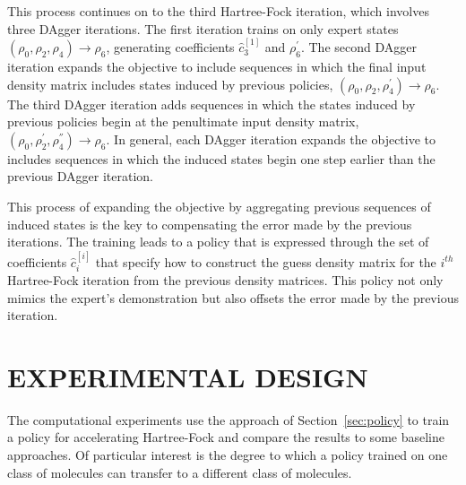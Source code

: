 \documentclass[twoside,11pt]{article}
\begin{document}
This process continues on to the third Hartree-Fock iteration, which involves three DAgger iterations. The first iteration trains on only expert states $(\rho_0, \rho_2, \rho_4) \rightarrow \rho_6$, generating coefficients $\hat{c}^{[1]}_3$ and $\rho_6^{'}$. The second DAgger iteration expands the objective to include sequences in which the final input density matrix includes states induced by previous policies, $(\rho_0, \rho_2, \rho_4^{'}) \rightarrow \rho_6$. The third DAgger iteration adds sequences in which the states induced by previous policies begin at the penultimate input density matrix,  $(\rho_0, \rho_2^{'}, \rho_{4}^{''}) \rightarrow \rho_6$. In general, each DAgger iteration expands the objective to includes sequences in which the induced states begin one step earlier than the previous DAgger iteration.  

This process of expanding the objective by aggregating previous sequences of induced states is the key to compensating the error made by the previous iterations. The training leads to a policy that is expressed through the set of coefficients $\hat{c}^{[i]}_i$ that specify how to construct the guess density matrix for the $i^{th}$ Hartree-Fock iteration from the previous density matrices. This policy not only mimics the expert's demonstration but also offsets the error made by the previous iteration.

\section{EXPERIMENTAL DESIGN}
The computational experiments use the approach of Section~\ref{sec:policy} to train a policy for accelerating Hartree-Fock and compare the results to some baseline approaches. Of particular interest is the degree to which a policy trained on one class of molecules can transfer to a different class of molecules.
\end{document}
